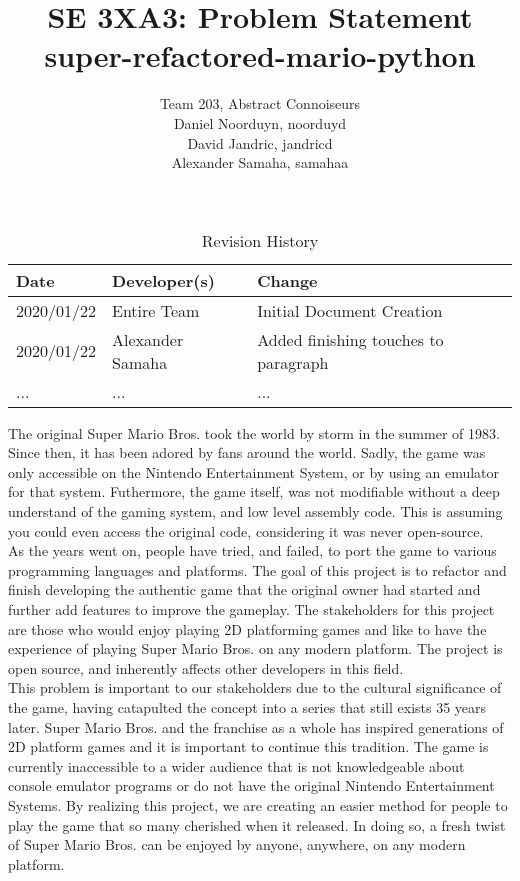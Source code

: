 \documentclass{article}
\title{SE 3XA3: Problem Statement\\super-refactored-mario-python}
\author{Team 203, Abstract Connoiseurs
		\\ Daniel Noorduyn, noorduyd
		\\ David Jandric, jandricd
		\\ Alexander Samaha, samahaa
}
\date{}
\begin{document}
\begin{table}[hp]
\caption{Revision History} \label{TblRevisionHistory}
\begin{tabularx}{\textwidth}{llX}
\toprule
\textbf{Date} & \textbf{Developer(s)} & \textbf{Change}\\
\midrule
2020/01/22 & Entire Team & Initial Document Creation\\
2020/01/22 & Alexander Samaha & Added finishing touches to paragraph\\
... & ... & ...\\
\bottomrule
\end{tabularx}
\end{table}

\newpage

\maketitle

The original Super Mario Bros. took the world by storm in the summer of 1983. Since then, it has been adored by fans around the world. Sadly, the game was only accessible on the Nintendo Entertainment System, or by using an emulator for that system. Futhermore, the game itself, was not modifiable without a deep understand of the gaming system, and low level assembly code. This is assuming you could even access the original code, considering it was never open-source.\\

As the years went on, people have tried, and failed, to port the game to various programming languages and platforms. The goal of this project is to refactor and finish developing the authentic game that the original owner had started and further add features to improve the gameplay. The stakeholders for this project are those who would enjoy playing 2D platforming games and like to have the experience of playing Super Mario Bros. on any modern platform. The project is open source, and inherently affects other developers in this field. \\ 

This problem is important to our stakeholders due to the cultural significance of the game, having catapulted the concept into a series that still exists 35 years later. Super Mario Bros. and the franchise as a whole has inspired generations of 2D platform games and it is important to continue this tradition. The game is currently inaccessible to a wider audience that is not knowledgeable about console emulator programs or do not have the original Nintendo Entertainment Systems. By realizing this project, we are creating an easier method for people to play the game that so many cherished when it released. In doing so, a fresh twist of Super Mario Bros. can be enjoyed by anyone, anywhere, on any modern platform.





\end{document}
